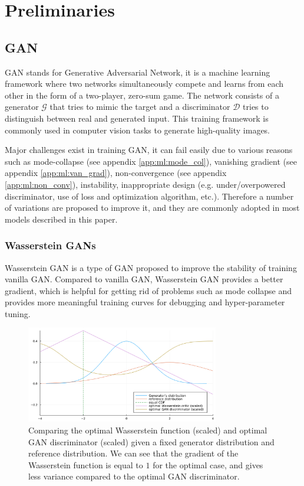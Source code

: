 \chapter{Preliminaries}
\label{chapterlabel2}

\section{GAN}

GAN stands for Generative Adversarial Network\cite{goodfellowGenerativeAdversarialNetworks2014a}, it is a machine learning framework where two networks simultaneously compete and learns from each other in the form of a two-player, zero-sum game. The network consists of a generator $\mathcal{G}$ that tries to mimic the target and a discriminator $\mathcal{D}$ tries to distinguish between real and generated input. This training framework is commonly used in computer vision tasks to generate high-quality images.

Major challenges exist in training GAN, it can fail easily due to various reasons such as mode-collapse (see appendix \ref{app:ml:mode_col}), vanishing gradient (see appendix \ref{app:ml:van_grad}), non-convergence (see appendix \ref{app:ml:non_conv}), instability, inappropriate design (e.g. under/overpowered discriminator, use of loss and optimization algorithm, etc.). Therefore a number of variations are proposed to improve it, and they are commonly adopted in most models described in this paper.


\subsection{Wasserstein GANs}
Wasserstein GAN\cite{arjovskyWassersteinGAN2017} is a type of GAN proposed to improve the stability of training vanilla GAN. Compared to vanilla GAN, Wasserstein GAN provides a better gradient, which is helpful for getting rid of problems such as mode collapse and provides more meaningful training curves for debugging and hyper-parameter tuning.

\begin{figure}
    \centering
    \includegraphics[width=0.75\textwidth]{images/preliminary/wgan_vs_gan_grad.png}
    \caption{Comparing the optimal Wasserstein function (scaled) and optimal GAN discriminator (scaled) given a fixed generator distribution and reference distribution. We can see that the gradient of the Wasserstein function is equal to $1$ for the optimal case, and gives less variance compared to the optimal GAN discriminator.\cite{FileWassersteinGANCritic}} 
    \label{fig:wgan_vs_gan_grad}
\end{figure}

